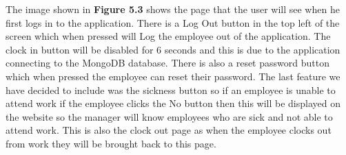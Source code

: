 The image shown in \textbf{Figure 5.3} shows the page that the user will see when he first logs in to the application. There is a Log Out button in the top left of the screen which when pressed will Log the employee out of the application. The clock in button will be disabled for 6 seconds and this is due to the application connecting to the MongoDB database. There is also a reset password button which when pressed the employee can reset their password. The last feature we have decided to include was the sickness button so if an employee is unable to attend work if the employee clicks the No button then this will be displayed on the website so the manager will know employees who are sick and not able to attend work. This is also the clock out page as when the employee clocks out from work they will be brought back to this page.
\FloatBarrier

